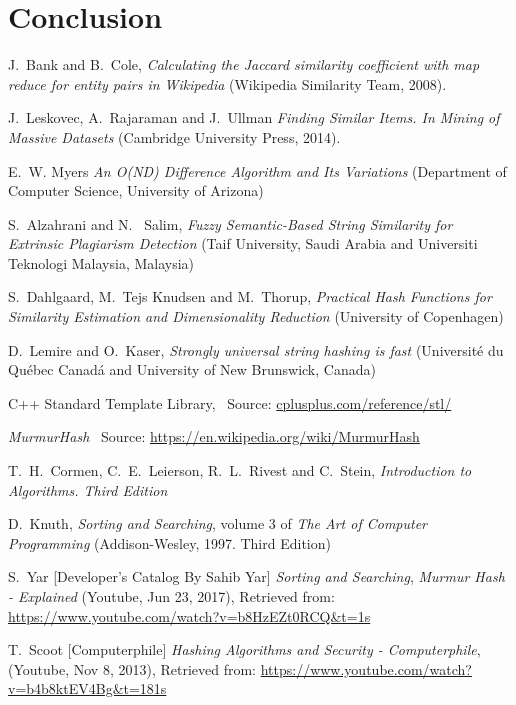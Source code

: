\documentclass[12pt]{article}
\begin{document}
\section{Conclusion}


\newpage

\begin{thebibliography}{100}

J.\ Bank and B.\ Cole,
\textit {Calculating the Jaccard similarity coefficient with map reduce for entity pairs in
Wikipedia} (Wikipedia Similarity Team, 2008).

J.\ Leskovec, A.\ Rajaraman and J.\ Ullman
\textit{ Finding Similar Items. In Mining of Massive Datasets} (Cambridge University Press, 2014).

E.\ W. Myers \textit{An O(ND) Difference Algorithm and Its Variations} (Department of Computer Science, University of Arizona)

S.\ Alzahrani and N. \ Salim, \textit{Fuzzy Semantic-Based String Similarity for Extrinsic Plagiarism Detection} (Taif University, Saudi Arabia and Universiti Teknologi Malaysia, Malaysia)

S.\ Dahlgaard, M.\ Tejs Knudsen and M.\ Thorup, \textit{Practical Hash Functions for Similarity Estimation and Dimensionality Reduction} (University of Copenhagen)

D.\ Lemire and O.\ Kaser, \textit{Strongly universal string hashing is fast} (Université du Québec Canadá and University of New Brunswick, Canada) 

C++ Standard Template Library,
\ Source: \url{cplusplus.com/reference/stl/}


\textit{MurmurHash} \ Source: \url{https://en.wikipedia.org/wiki/MurmurHash}

T.\ H.\ Cormen, C.\ E.\ Leierson, R.\ L.\ Rivest and C.\ Stein, \textit{Introduction to Algorithms. Third Edition}

D.\ Knuth,
\textit {Sorting and Searching}, volume 3 of \textit{The Art of Computer Programming} (Addison-Wesley, 1997. Third Edition)


S.\ Yar [Developer's Catalog By Sahib Yar]
\textit {Sorting and Searching}, \textit{Murmur Hash - Explained} (Youtube, Jun 23, 2017), Retrieved from: \url{https://www.youtube.com/watch?v=b8HzEZt0RCQ&t=1s}

T.\ Scoot [Computerphile]
\textit {Hashing Algorithms and Security - Computerphile}, (Youtube, Nov 8, 2013), Retrieved from: \url{https://www.youtube.com/watch?v=b4b8ktEV4Bg&t=181s}



\end{thebibliography}
\end{document}
